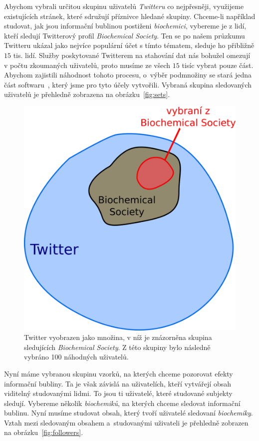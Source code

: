 \documentclass[12pt, a4paper]{article}
\numberwithin{equation}{section} 	%
\begin{document}
Abychom vybrali určitou skupinu uživatelů \textit{Twitteru} co nejpřesněji, využijeme existujících stránek, které sdružují příznivce hledané skupiny. Chceme-li například studovat, jak jsou informační bublinou postiženi \textit{biochemici}, vybereme je z lidí, kteří sledují Twitterový profil \textit{Biochemical Society}. Ten se po našem průzkumu Twitteru ukázal jako nejvíce populární účet s tímto tématem, sleduje ho přibližně $15$ tis. lidí. Služby poskytované Twitterem na stahování dat nás bohužel omezují v počtu zkoumaných uživatelů, proto musíme ze všech $15$ tisíc vybrat pouze část. Abychom zajistili náhodnost tohoto procesu, o~výběr podmnožiny se stará jedna část softwaru~\cite{myRepo}, který jsme pro tyto účely vytvořili. Vybraná skupina sledovaných uživatelů je přehledně zobrazena na obrázku~\autoref{fig:sets}.
\begin{figure}[h]\centering
\includegraphics[scale=0.27]{./Pics/sets.png}
    \caption{Twitter vyobrazen jako množina, v níž je znázorněna skupina sledujících \textit{Biochemical Society}. Z této skupiny bylo následně vybráno 100 náhodných uživatelů.}
\label{fig:sets}
\end{figure}

Nyní máme vybranou skupinu vzorků, na kterých chceme pozorovat efekty informační bubliny. Ta je však závislá na uživatelích, kteří vytvářejí obsah viditelný studovanými lidmi. To jsou ti uživatelé, které studované subjekty sledují. Vybereme několik \textit{biochemiků}, na kterých chceme sledovat informační bublinu. Nyní musíme studovat obsah, který tvoří uživatelé sledovaní \textit{biochemiky}. Vztah mezi sledovaným obsahem a~studovanými uživateli je přehledně zobrazen na obrázku~\autoref{fig:followers}.
\end{document}
